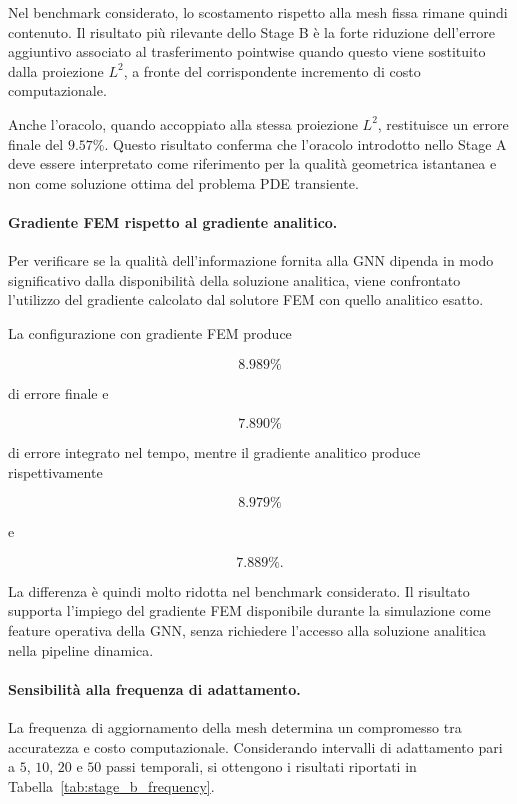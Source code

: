 Nel benchmark considerato, lo scostamento rispetto alla mesh fissa rimane quindi contenuto. Il risultato più rilevante dello Stage B è la forte riduzione dell'errore aggiuntivo associato al trasferimento pointwise quando questo viene sostituito dalla proiezione $L^2$, a fronte del corrispondente incremento di costo computazionale.

Anche l'oracolo, quando accoppiato alla stessa proiezione $L^2$, restituisce un errore finale del $9.57\%$. Questo risultato conferma che l'oracolo introdotto nello Stage A deve essere interpretato come riferimento per la qualità geometrica istantanea e non come soluzione ottima del problema PDE transiente.

\paragraph{Gradiente FEM rispetto al gradiente analitico.}

Per verificare se la qualità dell'informazione fornita alla GNN dipenda in modo significativo dalla disponibilità della soluzione analitica, viene confrontato l'utilizzo del gradiente calcolato dal solutore FEM con quello analitico esatto.

La configurazione con gradiente FEM produce

\[
8.989\%
\]

di errore finale e

\[
7.890\%
\]

di errore integrato nel tempo, mentre il gradiente analitico produce rispettivamente

\[
8.979\%
\]

e

\[
7.889\%.
\]

La differenza è quindi molto ridotta nel benchmark considerato. Il risultato supporta l'impiego del gradiente FEM disponibile durante la simulazione come feature operativa della GNN, senza richiedere l'accesso alla soluzione analitica nella pipeline dinamica.

\paragraph{Sensibilità alla frequenza di adattamento.}

La frequenza di aggiornamento della mesh determina un compromesso tra accuratezza e costo computazionale. Considerando intervalli di adattamento pari a $5$, $10$, $20$ e $50$ passi temporali, si ottengono i risultati riportati in Tabella~\ref{tab:stage_b_frequency}.

